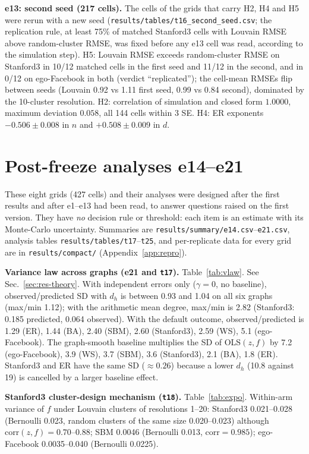 \textbf{e13: second seed (217 cells).} The cells of the grids that carry H2, H4 and H5 were rerun with a new seed (\texttt{results/tables/t16\_second\_seed.csv}; the replication rule, at least 75\% of matched Stanford3 cells with Louvain RMSE above random-cluster RMSE, was fixed before any e13 cell was read, according to the simulation step). H5: Louvain RMSE exceeds random-cluster RMSE on Stanford3 in 10/12 matched cells in the first seed and 11/12 in the second, and in 0/12 on ego-Facebook in both (verdict ``replicated''); the cell-mean RMSEs flip between seeds (Louvain 0.92 vs 1.11 first seed, 0.99 vs 0.84 second), dominated by the 10-cluster resolution. H2: correlation of simulation and closed form $1.0000$, maximum deviation $0.058$, all 144 cells within 3 SE. H4: ER exponents $-0.506\pm0.008$ in $n$ and $+0.508\pm0.009$ in $d$.

\section{Post-freeze analyses e14--e21}
\label{app:post2}
These eight grids (427 cells) and their analyses were designed after the first results and after e1--e13 had been read, to answer questions raised on the first version. They have \emph{no} decision rule or threshold: each item is an estimate with its Monte-Carlo uncertainty. Summaries are \texttt{results/summary/e14.csv}--\texttt{e21.csv}, analysis tables \texttt{results/tables/t17}--\texttt{t25}, and per-replicate data for every grid are in \texttt{results/compact/} (Appendix~\ref{app:repro}).

\textbf{Variance law across graphs (e21 and \texttt{t17}).} Table~\ref{tab:vlaw}.  See Sec.~\ref{sec:res-theory}. With independent errors only ($\gamma=0$, no baseline), observed/predicted SD with $d_h$ is between 0.93 and 1.04 on all six graphs (max/min 1.12); with the arithmetic mean degree, max/min is 2.82 (Stanford3: 0.185 predicted, 0.064 observed). With the default outcome, observed/predicted is 1.29 (ER), 1.44 (BA), 2.40 (SBM), 2.60 (Stanford3), 2.59 (WS), 5.1 (ego-Facebook). The graph-smooth baseline multiplies the SD of OLS$(z,f)$ by 7.2 (ego-Facebook), 3.9 (WS), 3.7 (SBM), 3.6 (Stanford3), 2.1 (BA), 1.8 (ER). Stanford3 and ER have the same SD ($\approx0.26$) because a lower $d_h$ (10.8 against 19) is cancelled by a larger baseline effect.

\textbf{Stanford3 cluster-design mechanism (\texttt{t18}).} Table~\ref{tab:expo}.  Within-arm variance of $f$ under Louvain clusters of resolutions 1--20: Stanford3 0.021--0.028 (Bernoulli 0.023, random clusters of the same size 0.020--0.023) although $\mathrm{corr}(z,f)=0.70$--$0.88$; SBM 0.0046 (Bernoulli 0.013, $\mathrm{corr}=0.985$); ego-Facebook 0.0035--0.040 (Bernoulli 0.0225).

